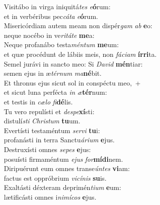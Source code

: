 \evenverse Visitábo in virga iniquitá\textit{tes} \textit{e}\textbf{ó}rum:~\*\\
\evenverse et in verbéribus pec\textit{cá}\textit{ta} \textit{e}\textbf{ó}rum.\\
\oddverse Misericórdiam autem meam non dispér\textit{gam} \textit{ab} \textbf{e}o:~\*\\
\oddverse neque nocébo in ve\textit{ri}\textit{tá}\textit{te} \textbf{me}a:\\
\evenverse Neque profanábo testa\textit{mén}\textit{tum} \textbf{me}um:~\*\\
\evenverse et quæ procédunt de lábiis meis, non \textit{fá}\textit{ci}\textit{am} \textbf{ír}\textbf{ri}ta.\\
\oddverse Semel jurávi in sancto meo: Si \textit{Da}\textit{vid} \textbf{mén}tiar:~\*\\
\oddverse semen ejus in æ\textit{tér}\textit{num} \textit{ma}\textbf{né}bit.\\
\evenverse Et thronus ejus sicut sol in conspéctu meo,~+\\
\evenverse  et sicut luna perfécta \textit{in} \textit{æ}\textbf{tér}num:~\*\\
\evenverse et testis in \textit{cæ}\textit{lo} \textit{fi}\textbf{dé}lis.\\
\oddverse Tu vero repulísti et \textit{de}\textit{spe}\textbf{xí}sti:~\*\\
\oddverse distulí\textit{sti} \textit{Chri}\textit{stum} \textbf{tu}um.\\
\evenverse Evertísti testaméntum \textit{ser}\textit{vi} \textbf{tu}i:~\*\\
\evenverse profanásti in terra Sanctu\textit{á}\textit{ri}\textit{um} \textbf{e}jus.\\
\oddverse Destruxísti omnes \textit{se}\textit{pes} \textbf{e}jus:~\*\\
\oddverse posuísti firmaméntum \textit{e}\textit{jus} \textit{for}\textbf{mí}\textbf{di}nem.\\
\evenverse Diripuérunt eum omnes transe\textit{ún}\textit{tes} \textbf{vi}am:~\*\\
\evenverse factus est oppróbrium \textit{vi}\textit{cí}\textit{nis} \textbf{su}is.\\
\oddverse Exaltásti déxteram deprimén\textit{ti}\textit{um} \textbf{e}um:~\*\\
\oddverse lætificásti omnes i\textit{ni}\textit{mí}\textit{cos} \textbf{e}jus.\\
